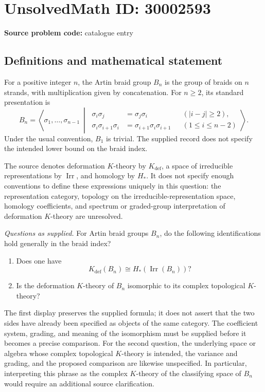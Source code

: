 \documentclass[11pt]{article}
\begin{document}
\section*{UnsolvedMath ID: 30002593}
\textbf{Source problem code:} catalogue entry
\subsection{Definitions and mathematical statement}
For a positive integer \(n\), the Artin braid group \(B_n\) is the group of braids on \(n\) strands, with multiplication given by concatenation. For \(n\geq 2\), its standard presentation is
\[
B_n=\left\langle \sigma_1,\ldots,\sigma_{n-1}\ \middle|\ \begin{aligned}
\sigma_i\sigma_j&=\sigma_j\sigma_i &&(|i-j|\geq 2),\\
\sigma_i\sigma_{i+1}\sigma_i&=\sigma_{i+1}\sigma_i\sigma_{i+1} &&(1\leq i\leq n-2)
\end{aligned}\right\rangle.
\]
Under the usual convention, \(B_1\) is trivial. The supplied record does not specify the intended lower bound on the braid index.

The source denotes deformation \(K\)-theory by \(K_{\mathrm{def}}\), a space of irreducible representations by \(\operatorname{Irr}\), and homology by \(H_*\). It does not specify enough conventions to define these expressions uniquely in this question: the representation category, topology on the irreducible-representation space, homology coefficients, and spectrum or graded-group interpretation of deformation \(K\)-theory are unresolved.

\emph{Questions as supplied.} For Artin braid groups \(B_n\), do the following identifications hold generally in the braid index?
\begin{enumerate}
\item Does one have
\[
K_{\mathrm{def}}(B_n)\cong H_*(\operatorname{Irr}(B_n))?
\]
\item Is the deformation \(K\)-theory of \(B_n\) isomorphic to its complex topological \(K\)-theory?
\end{enumerate}
The first display preserves the supplied formula; it does not assert that the two sides have already been specified as objects of the same category. The coefficient system, grading, and meaning of the isomorphism must be supplied before it becomes a precise comparison. For the second question, the underlying space or algebra whose complex topological \(K\)-theory is intended, the variance and grading, and the proposed comparison are likewise unspecified. In particular, interpreting this phrase as the complex \(K\)-theory of the classifying space of \(B_n\) would require an additional source clarification.
\end{document}
